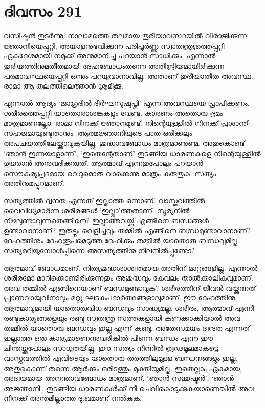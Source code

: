 \section{ദിവസം 291}


വസിഷ്ഠന്‍ തുടര്‍ന്നു: നാലാമത്തെ തലമായ തുരീയാവസ്ഥയില്‍ വിരാജിക്കുന്ന ജ്ഞാനിയെപ്പറ്റി, അയാളനുഭവിക്കുന്ന പരിപൂര്‍ണ്ണ സ്വാതന്ത്ര്യത്തെപ്പറ്റി ഏകദേശമായി നമുക്ക് അനുമാനിച്ചു പറയാന്‍ സാധിക്കും. എന്നാല്‍ തുരീയത്തിനുമതീതമായി ദേഹബോധംതന്നെ അതീന്ദ്രിയമായിരിക്കുന്ന പരമാവസ്ഥയെപ്പറ്റി ഒന്നും പറയുവാനാവില്ല. അതാണ്‌ തുരീയാതീത അവസ്ഥ. രാമാ ആ തലത്തിലെത്താന്‍ ശ്രമിക്കൂ. 

എന്നാല്‍ ആദ്യം ‘ജാഗ്രദില്‍ ദീര്‍ഘസുഷുപ്തി’ എന്ന അവസ്ഥയെ പ്രാപിക്കണം. ശരീരത്തെപ്പറ്റി യാതൊരാശങ്കകളും വേണ്ട. കാരണം അതൊരു ഭ്രമം മാത്രമാണല്ലോ. രാമാ നിനക്ക് ജ്ഞാനമുണ്ട്. നിന്റെയുള്ളില്‍ നിനക്ക് പ്രശാന്തി സഹജമായുണ്ടുതാനും. ആത്മജ്ഞാനിയുടെ പാത ഒരിക്കലും അപചയത്തിലേയ്ക്കാവുകയില്ല. ശുദ്ധാവബോധം മാത്രമാണുണ്മ. അതുകൊണ്ട് ‘ഞാന്‍ ഇന്നയാളാണ്’, ‘ഇതെന്റേതാണ്’ തുടങ്ങിയ ധാരണകളെ നിന്റെയുള്ളില്‍ ഉയരാന്‍ അനുവദിക്കരുത്. ആത്മാവ് എന്നതുപോലും പറയാന്‍ സൌകര്യപ്രദമായ വെറുമൊരു വാക്കെന്നു മാത്രം കരുതുക. സത്യം അതിനുമപ്പുറമാണ്.

സത്യത്തില്‍ ദ്വന്ദത എന്നത് ഇല്ലാത്ത ഒന്നാണ്. വാസ്തവത്തില്‍ വൈവിധ്യമാര്‍ന്ന ശരീരങ്ങള്‍ ‘ഇല്ലാ’ത്തതാണ്. സൂര്യനില്‍ നിഴലുണ്ടാവുന്നതെങ്ങിനെ? ഇല്ലാത്തവയ്ക്ക്‌ എങ്ങിനെ ബന്ധങ്ങള്‍ ഉണ്ടാവാനാണ്? ഇരുട്ടും വെളിച്ചവും തമ്മില്‍ എങ്ങിനെ ബന്ധമുണ്ടാവാനാണ്? ദേഹത്തിനും ദേഹരൂപമെടുത്ത ദേഹിക്കും തമ്മില്‍ യാതൊരു ബന്ധവുമില്ല. സത്യമറിയുമ്പോള്‍പ്പിന്നെ അസത്യത്തിനു നിലനില്‍പ്പുണ്ടോ?

ആത്മാവ് ബോധമാണ്. നിത്യശുദ്ധശാശ്വതമായ അതിന് മാറ്റങ്ങളില്ല. എന്നാല്‍ ശരീരമോ മാറിക്കൊണ്ടിരിക്കുന്നതും അശുദ്ധവും കേവലം താല്‍ക്കാലികവുമാണ്. അവ തമ്മില്‍ എങ്ങിനെയാണ് ബന്ധമുണ്ടാവുക? ശരീരത്തിന് ജീവന്‍ വയ്ക്കുന്നത് പ്രാണവായുവിനാലും മറ്റു ഘടകപദാര്‍ത്ഥങ്ങളാലുമാണ്. ഈ ദേഹത്തിനു ആത്മാവുമായി യാതൊരുവിധ ബന്ധവും സാദ്ധ്യമല്ല. ശരീരം, ആത്മാവ് എന്നീ രണ്ടുകാര്യങ്ങളെയും രണ്ടു സ്വതന്ത്ര സത്തകളായി കണക്കാക്കിയാല്‍ അവ തമ്മില്‍ യാതൊരു ബന്ധവും ഇല്ല എന്ന് കണ്ടു. അതേസമയം ദ്വന്ദത എന്നത് ഇല്ലാത്ത ഒരു കാര്യമാണെന്നുവരികില്‍ പിന്നെ ബന്ധം എന്ന ഈ ചിന്തയ്ക്കുപോലും സാധുതയില്ല. ഈ സത്യം നിന്നില്‍ രൂഢമൂലമാകട്ടെ. വാസ്തവത്തില്‍ എവിടെയും യാതൊരു തരത്തിലുമുള്ള ബന്ധനങ്ങളും ഇല്ല. അതുകൊണ്ട് തന്നെ ആര്‍ക്കും ഒരിടത്തും മുക്തിയുമില്ല. ഇതെല്ലാം ഏകമായ, അദ്വയമായ അനന്താവബോധം മാത്രമാണ്. ‘ഞാന്‍ സന്തുഷ്ടന്‍’, ‘ഞാന്‍ അജ്ഞാനി’, തുടങ്ങിയ ധാരണകള്‍ക്ക് നീ ചെവികൊടുക്കുകയാണെങ്കില്‍ അവ നിനക്ക് അന്തമില്ലാത്ത ദു:ഖമാണ് നല്‍കുക. 

